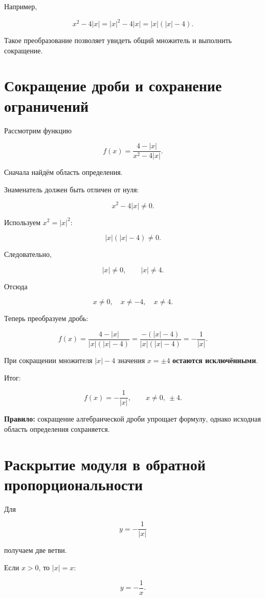 \documentclass[a4paper,12pt]{article}
\newcommand{\key}[1]{\textcolor{darkaccent}{\textbf{#1}}}
\begin{document}
Например,

\[
x^2-4|x|
=
|x|^2-4|x|
=
|x|(|x|-4).
\]

Такое преобразование позволяет увидеть общий множитель и выполнить сокращение.


\section{Сокращение дроби и сохранение ограничений}

Рассмотрим функцию

\[
f(x)=
\frac{4-|x|}
{x^2-4|x|}.
\]

Сначала найдём область определения.

Знаменатель должен быть отличен от нуля:

\[
x^2-4|x|\ne0.
\]

Используем \(x^2=|x|^2\):

\[
|x|(|x|-4)\ne0.
\]

Следовательно,

\[
|x|\ne0,
\qquad
|x|\ne4.
\]

Отсюда

\[
\boxed{x\ne0,\quad x\ne-4,\quad x\ne4.}
\]

Теперь преобразуем дробь:

\[
f(x)=
\frac{4-|x|}
{|x|(|x|-4)}
=
\frac{-(|x|-4)}
{|x|(|x|-4)}
=
-\frac1{|x|}.
\]

При сокращении множителя \(|x|-4\) значения \(x=\pm4\)
\key{остаются исключёнными}.

Итог:

\[
\boxed{
f(x)=-\frac1{|x|},
\qquad
x\ne0,\ \pm4.
}
\]

\key{Правило:}
сокращение алгебраической дроби упрощает формулу, однако исходная область определения сохраняется.


\section{Раскрытие модуля в обратной пропорциональности}

Для

\[
y=-\frac1{|x|}
\]

получаем две ветви.

Если \(x>0\), то \(|x|=x\):

\[
y=-\frac1x.
\]
\end{document}
